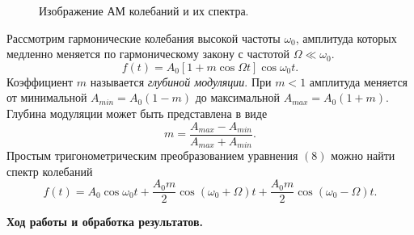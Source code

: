 \documentclass[a4paper, 12pt]{article}%
\begin{document}
	\begin{figure}[H]
		\caption{Изображение АМ колебаний и их спектра.}
	\end{figure}
	Рассмотрим гармонические колебания высокой частоты $\omega_0$, амплитуда которых медленно меняется по гармоническому закону с частотой $\Omega \ll \omega_0$.
	\begin{equation}
		f(t) = A_0 \left[1+m\cos \Omega t\right] \cos \omega_0 t.
	\end{equation}
	Коэффициент $m$ называется \textit{глубиной модуляции}. При $m < 1$ амплитуда меняется от минимальной $A_{min} = A_0(1-m)$ до максимальной $A_{max} = A_0(1+m)$. Глубина модуляции может быть представлена в виде
	\begin{equation}
		m = \dfrac{A_{max}-A_{min}}{A_{max}+A_{min}}.
	\end{equation}
	Простым тригонометрическим преобразованием уравнения $(8)$ можно найти спектр колебаний
	\begin{equation}
		f(t) = A_0 \cos \omega_0t + \dfrac{A_0m}{2} \cos \left(\omega_0 + \Omega\right)t + \dfrac{A_0m}{2}\cos\left(\omega_0 - \Omega\right)t.
	\end{equation}
	
	
	\newpage
	
	\textbf{Ход работы и обработка результатов.}\\
	
\end{document}
